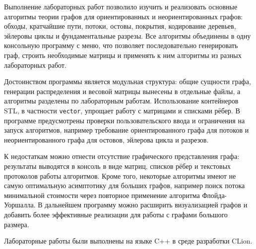 \documentclass[a4paper,final]{article}
\begin{document}
Выполнение лабораторных работ позволило изучить и реализовать основные алгоритмы теории графов для ориентированных и неориентированных графов: обходы, кратчайшие пути, потоки, остовы, покрытия, кодирование деревьев, эйлеровы циклы и фундаментальные разрезы. Все алгоритмы объединены в одну консольную программу с меню, что позволяет последовательно генерировать граф, строить необходимые матрицы и применять к ним алгоритмы из разных лабораторных работ.

Достоинством программы является модульная структура: общие сущности графа, генерации распределения и весовой матрицы вынесены в отдельные файлы, а алгоритмы разделены по лабораторным работам. Использование контейнеров STL, в частности \texttt{vector}, упрощает работу с матрицами и списками рёбер. В программе предусмотрены проверки пользовательского ввода и ограничения на запуск алгоритмов, например требование ориентированного графа для потоков и неориентированного графа для остовов, эйлерова цикла и разрезов.

К недостаткам можно отнести отсутствие графического представления графа: результаты выводятся в консоль в виде матриц, списков рёбер и текстовых протоколов работы алгоритмов. Кроме того, некоторые алгоритмы имеют не самую оптимальную асимптотику для больших графов, например поиск потока минимальной стоимости через повторное применение алгоритма Флойда-Уоршалла. В дальнейшем программу можно расширить визуализацией графов и добавить более эффективные реализации для работы с графами большого размера.

Лабораторные работы были выполнены на языке C++ в среде разработки CLion.
\end{document}
